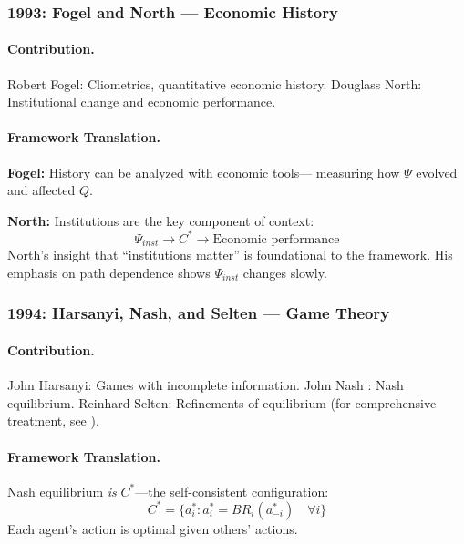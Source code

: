 \subsubsection{1993: Fogel and North --- Economic History}

\paragraph{Contribution.}
Robert Fogel: Cliometrics, quantitative economic history.
Douglass North: Institutional change and economic performance.

\paragraph{Framework Translation.}
\textbf{Fogel:} History can be analyzed with economic tools---
measuring how $\Psi$ evolved and affected $Q$.

\textbf{North:} Institutions are the key component of context:
\begin{equation}
  \Psi_{inst} \to C^* \to \text{Economic performance}
\end{equation}
North's insight that ``institutions matter'' is foundational to the framework.
His emphasis on path dependence shows $\Psi_{inst}$ changes slowly.

\subsubsection{1994: Harsanyi, Nash, and Selten --- Game Theory}

\paragraph{Contribution.}
John Harsanyi: Games with incomplete information.
John Nash \citep{nash1950}: Nash equilibrium.
Reinhard Selten: Refinements of equilibrium (for comprehensive treatment, see \citealt{fudenbergtirole1991}).

\paragraph{Framework Translation.}
Nash equilibrium \emph{is} $C^*$---the self-consistent configuration:
\begin{equation}
  C^* = \{a^*_i : a^*_i = BR_i(a^*_{-i}) \quad \forall i\}
\end{equation}
Each agent's action is optimal given others' actions.

